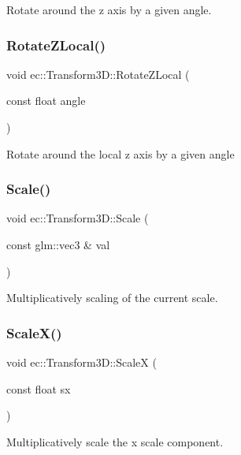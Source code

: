 Rotate around the z axis by a given angle. \mbox{\label{classec_1_1_transform3_d_aba0aba873f12438d20f059bd86702135}} 
\subsubsection{\texorpdfstring{Rotate\+Z\+Local()}{RotateZLocal()}}
{\footnotesize\ttfamily void ec\+::\+Transform3\+D\+::\+Rotate\+Z\+Local (\begin{DoxyParamCaption}\item[{const float}]{angle }\end{DoxyParamCaption})}

Rotate around the local z axis by a given angle \mbox{\label{classec_1_1_transform3_d_a6f6909d1f35cc5c4d4340e6fe56d5e4d}} 
\subsubsection{\texorpdfstring{Scale()}{Scale()}}
{\footnotesize\ttfamily void ec\+::\+Transform3\+D\+::\+Scale (\begin{DoxyParamCaption}\item[{const glm\+::vec3 \&}]{val }\end{DoxyParamCaption})}

Multiplicatively scaling of the current scale. \mbox{\label{classec_1_1_transform3_d_a17289ae542625db691f2d4944c8213fb}} 
\subsubsection{\texorpdfstring{Scale\+X()}{ScaleX()}}
{\footnotesize\ttfamily void ec\+::\+Transform3\+D\+::\+ScaleX (\begin{DoxyParamCaption}\item[{const float}]{sx }\end{DoxyParamCaption})}

Multiplicatively scale the x scale component. \mbox{\label{classec_1_1_transform3_d_a8b85b17f0879d8f5f0f14746d6a13f51}} 
